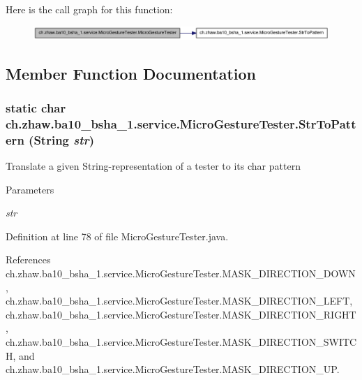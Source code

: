 Here is the call graph for this function:\nopagebreak
\begin{figure}[H]
\begin{center}
\leavevmode
\includegraphics[width=349pt]{classch_1_1zhaw_1_1ba10__bsha__1_1_1service_1_1MicroGestureTester_ac8c8bca517c9612baa7c7b4913c8070a_cgraph}
\end{center}
\end{figure}


\subsection{Member Function Documentation}
\hypertarget{classch_1_1zhaw_1_1ba10__bsha__1_1_1service_1_1MicroGestureTester_aa41e1a503c94f303bea8c1e2a50b930d}{
\subsubsection[{StrToPattern}]{\setlength{\rightskip}{0pt plus 5cm}static char ch.zhaw.ba10\_\-bsha\_\-1.service.MicroGestureTester.StrToPattern (String {\em str})}}
\label{classch_1_1zhaw_1_1ba10__bsha__1_1_1service_1_1MicroGestureTester_aa41e1a503c94f303bea8c1e2a50b930d}
Translate a given String-\/representation of a tester to its char pattern


\begin{DoxyParams}{Parameters}
\item[{\em str}]\end{DoxyParams}


Definition at line 78 of file MicroGestureTester.java.

References ch.zhaw.ba10\_\-bsha\_\-1.service.MicroGestureTester.MASK\_\-DIRECTION\_\-DOWN, ch.zhaw.ba10\_\-bsha\_\-1.service.MicroGestureTester.MASK\_\-DIRECTION\_\-LEFT, ch.zhaw.ba10\_\-bsha\_\-1.service.MicroGestureTester.MASK\_\-DIRECTION\_\-RIGHT, ch.zhaw.ba10\_\-bsha\_\-1.service.MicroGestureTester.MASK\_\-DIRECTION\_\-SWITCH, and ch.zhaw.ba10\_\-bsha\_\-1.service.MicroGestureTester.MASK\_\-DIRECTION\_\-UP.

